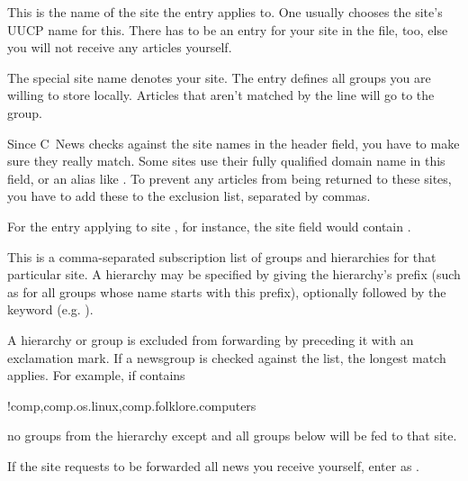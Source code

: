 \documentclass[11pt,makeidx]{report}
\begin{document}
{\newpage
\clearpage
\samepage \begin{dispitems}%
	This is the name of the site the entry applies to. One usually
	chooses the site's UUCP name for this.  There has to be an entry
	for your site in the  file, too, else you will not
	receive any articles yourself.


	The special site name  denotes your site. The
	 entry defines all groups you are willing to store
	locally. Articles that aren't matched by the  line
	will go to the  group.


	Since C~News checks  against the site names in
	the  header field, you have to make sure they really
	match. Some sites use their fully qualified domain name in this
	field, or an alias like . To prevent
	any articles from being returned to these sites, you have to add
	these to the exclusion list, separated by commas.


	For the entry applying to site , for instance, the
	site field would contain .

	This is a comma-separated subscription list of groups and
	hierarchies for that particular site. A hierarchy may be specified
	by giving the hierarchy's prefix (such as 
	for all groups whose name starts with this prefix), optionally
	followed by the keyword  (e.g. ).


	A hierarchy or group is excluded from forwarding by preceding it
	with an exclamation mark. If a newsgroup is checked against the
	list, the longest match applies. For example, if 
	contains

	\begin{tscreen}
	!comp,comp.os.linux,comp.folklore.computers
	\end{tscreen}

	\noindent
        no groups from the  hierarchy except
	 and all groups below
	 will be fed to that site.


	If the site requests to be forwarded all news
	you receive yourself, enter  as .



\end{dispitems}}
\end{document}
